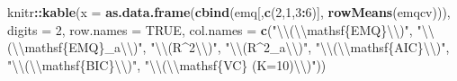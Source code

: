 \documentclass[
]{book}
\newenvironment{Shaded}{\begin{snugshade}}{\end{snugshade}}
\newcommand{\CharTok}[1]{\textcolor[rgb]{0.31,0.60,0.02}{#1}}
\newcommand{\DataTypeTok}[1]{\textcolor[rgb]{0.13,0.29,0.53}{#1}}
\newcommand{\DecValTok}[1]{\textcolor[rgb]{0.00,0.00,0.81}{#1}}
\newcommand{\KeywordTok}[1]{\textcolor[rgb]{0.13,0.29,0.53}{\textbf{#1}}}
\newcommand{\NormalTok}[1]{#1}
\newcommand{\OperatorTok}[1]{\textcolor[rgb]{0.81,0.36,0.00}{\textbf{#1}}}
\newcommand{\OtherTok}[1]{\textcolor[rgb]{0.56,0.35,0.01}{#1}}
\newcommand{\StringTok}[1]{\textcolor[rgb]{0.31,0.60,0.02}{#1}}
\theoremstyle{definition}
\theoremstyle{definition}
\theoremstyle{definition}
\theoremstyle{remark}
\begin{document}
\begin{Shaded}
\begin{Highlighting}[]
\NormalTok{knitr}\OperatorTok{::}\KeywordTok{kable}\NormalTok{(}\DataTypeTok{x =} \KeywordTok{as.data.frame}\NormalTok{(}\KeywordTok{cbind}\NormalTok{(emq[,}\KeywordTok{c}\NormalTok{(}\DecValTok{2}\NormalTok{,}\DecValTok{1}\NormalTok{,}\DecValTok{3}\OperatorTok{:}\DecValTok{6}\NormalTok{)], }\KeywordTok{rowMeans}\NormalTok{(emqcv))), }
             \DataTypeTok{digits =} \DecValTok{2}\NormalTok{, }
             \DataTypeTok{row.names =} \OtherTok{TRUE}\NormalTok{,}
            \DataTypeTok{col.names =} \KeywordTok{c}\NormalTok{(}\StringTok{"}\CharTok{\textbackslash{}\textbackslash{}}\StringTok{(}\CharTok{\textbackslash{}\textbackslash{}}\StringTok{mathsf\{EMQ\}}\CharTok{\textbackslash{}\textbackslash{}}\StringTok{)"}\NormalTok{,}
                          \StringTok{"}\CharTok{\textbackslash{}\textbackslash{}}\StringTok{(}\CharTok{\textbackslash{}\textbackslash{}}\StringTok{mathsf\{EMQ\}_a}\CharTok{\textbackslash{}\textbackslash{}}\StringTok{)"}\NormalTok{,}
                          \StringTok{"}\CharTok{\textbackslash{}\textbackslash{}}\StringTok{(R^2}\CharTok{\textbackslash{}\textbackslash{}}\StringTok{)"}\NormalTok{, }\StringTok{"}\CharTok{\textbackslash{}\textbackslash{}}\StringTok{(R^2_a}\CharTok{\textbackslash{}\textbackslash{}}\StringTok{)"}\NormalTok{,}
                          \StringTok{"}\CharTok{\textbackslash{}\textbackslash{}}\StringTok{(}\CharTok{\textbackslash{}\textbackslash{}}\StringTok{mathsf\{AIC\}}\CharTok{\textbackslash{}\textbackslash{}}\StringTok{)"}\NormalTok{,}
                          \StringTok{"}\CharTok{\textbackslash{}\textbackslash{}}\StringTok{(}\CharTok{\textbackslash{}\textbackslash{}}\StringTok{mathsf\{BIC\}}\CharTok{\textbackslash{}\textbackslash{}}\StringTok{)"}\NormalTok{,}
                          \StringTok{"}\CharTok{\textbackslash{}\textbackslash{}}\StringTok{(}\CharTok{\textbackslash{}\textbackslash{}}\StringTok{mathsf\{VC\} (K=10)}\CharTok{\textbackslash{}\textbackslash{}}\StringTok{)"}\NormalTok{))}
\end{Highlighting}
\end{Shaded}
\end{document}
